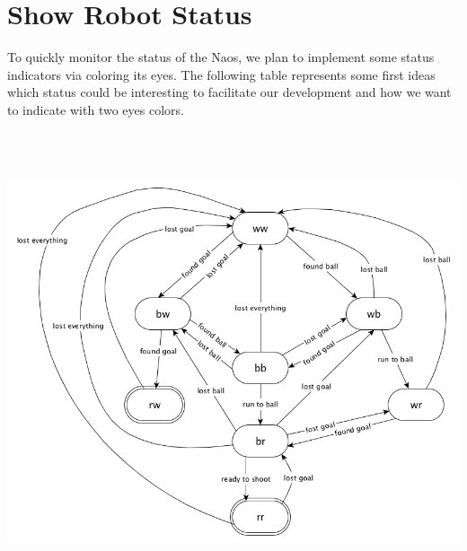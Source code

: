 \documentclass[12pt]{article}
\theoremstyle{definition}
\newcommand{\unclear}[1]{\vspace{.5em}\parbox{.9\linewidth}{\color{red}{\bf Remark: #1}}\vspace{.5em}}
\begin{document}
\section{Show Robot Status}
To quickly monitor the status of the Naos, we plan to implement some status indicators via coloring its eyes. The following table represents some first ideas which status could be interesting to facilitate our development and how we want to indicate with two eyes colors.
\\[1em]
\unclear{In the next table: What is if the Nao sees the goal? What means the red/red status? What do you mean by ``the x/y state is necessary?}
\\
\unclear{Please check if the state diagram is okay, and the table beneath}\\
\includegraphics[scale=.5]{stateDiagram.png} 
\end{document}
